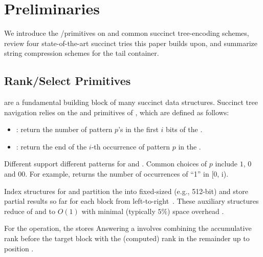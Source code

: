 \section{Preliminaries}\label{sec:preliminaries}

We introduce the \rankop/\selectop primitives on \bvs and common succinct
tree-encoding schemes, review four state-of-the-art succinct tries this paper
builds upon, and summarize string compression schemes for the tail container.

\subsection{Rank/Select Primitives}

\Bvs are a fundamental building block of many succinct data structures. Succinct
tree navigation relies on the \rankop and \selectop primitives of \bvs, which
are defined as follows:
\begin{itemize}
  \item {}: return the number of pattern $p$'s in the first $i$ bits of the \bv.
  \item {}: return the end of the $i$-th occurrence of pattern $p$ in the \bv.
\end{itemize}
Different \bvs support different patterns for \rankop and \selectop. Common
choices of $p$ include $1$, $0$ and $00$. For example, 
returns the number of occurrences of ``1'' in  [0, i).


Index structures for \rankop and \selectop partition the \bv into fixed-sized
(e.g., 512-bit)  and store partial results so far for
each block from left-to-right~\cite{rank_select_1}.  These auxiliary structures
reduce  of \rankop and
\selectop to $O(1)$ with minimal (typically  $5\%$) space overhead
\cite{surf,rank_select_0,rank_select_1,rank_select_2,rank_select_3,sds_overview,ds2i,optimized_rank,terark_bv}.

For the \rankop operation, the  stores  Answering a 
involves combining the accumulative rank before the target block with the
(computed) rank in the remainder up to position .

